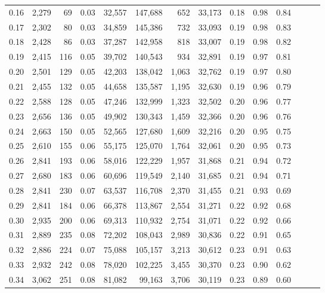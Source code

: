 \begin{tabular}{rrrrrrrrrrrrrr}
0.16 &  2,279 &     69 &  0.03 &   32,557 &  147,688 &     652 &  33,173 &  0.18 &  0.98 &      0.84 \\
0.17 &  2,302 &     80 &  0.03 &   34,859 &  145,386 &     732 &  33,093 &  0.19 &  0.98 &      0.83 \\
0.18 &  2,428 &     86 &  0.03 &   37,287 &  142,958 &     818 &  33,007 &  0.19 &  0.98 &      0.82 \\
0.19 &  2,415 &    116 &  0.05 &   39,702 &  140,543 &     934 &  32,891 &  0.19 &  0.97 &      0.81 \\
0.20 &  2,501 &    129 &  0.05 &   42,203 &  138,042 &   1,063 &  32,762 &  0.19 &  0.97 &      0.80 \\
0.21 &  2,455 &    132 &  0.05 &   44,658 &  135,587 &   1,195 &  32,630 &  0.19 &  0.96 &      0.79 \\
0.22 &  2,588 &    128 &  0.05 &   47,246 &  132,999 &   1,323 &  32,502 &  0.20 &  0.96 &      0.77 \\
0.23 &  2,656 &    136 &  0.05 &   49,902 &  130,343 &   1,459 &  32,366 &  0.20 &  0.96 &      0.76 \\
0.24 &  2,663 &    150 &  0.05 &   52,565 &  127,680 &   1,609 &  32,216 &  0.20 &  0.95 &      0.75 \\
0.25 &  2,610 &    155 &  0.06 &   55,175 &  125,070 &   1,764 &  32,061 &  0.20 &  0.95 &      0.73 \\
0.26 &  2,841 &    193 &  0.06 &   58,016 &  122,229 &   1,957 &  31,868 &  0.21 &  0.94 &      0.72 \\
0.27 &  2,680 &    183 &  0.06 &   60,696 &  119,549 &   2,140 &  31,685 &  0.21 &  0.94 &      0.71 \\
0.28 &  2,841 &    230 &  0.07 &   63,537 &  116,708 &   2,370 &  31,455 &  0.21 &  0.93 &      0.69 \\
0.29 &  2,841 &    184 &  0.06 &   66,378 &  113,867 &   2,554 &  31,271 &  0.22 &  0.92 &      0.68 \\
0.30 &  2,935 &    200 &  0.06 &   69,313 &  110,932 &   2,754 &  31,071 &  0.22 &  0.92 &      0.66 \\
0.31 &  2,889 &    235 &  0.08 &   72,202 &  108,043 &   2,989 &  30,836 &  0.22 &  0.91 &      0.65 \\
0.32 &  2,886 &    224 &  0.07 &   75,088 &  105,157 &   3,213 &  30,612 &  0.23 &  0.91 &      0.63 \\
0.33 &  2,932 &    242 &  0.08 &   78,020 &  102,225 &   3,455 &  30,370 &  0.23 &  0.90 &      0.62 \\
0.34 &  3,062 &    251 &  0.08 &   81,082 &   99,163 &   3,706 &  30,119 &  0.23 &  0.89 &      0.60 \\

\end{tabular}
